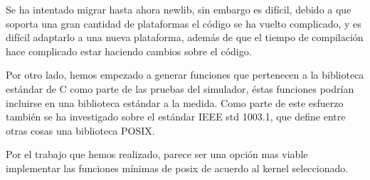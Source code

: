Se ha intentado migrar hasta ahora newlib, sin embargo es dif\'icil, debido a que soporta una gran cantidad de plataformas el c\'odigo se ha vuelto complicado, y es dif\'icil adaptarlo a una nueva plataforma, adem\'as de que el tiempo de compilaci\'on hace complicado estar haciendo cambios sobre el c\'odigo.

Por otro lado, hemos empezado a generar funciones que pertenecen a la biblioteca est\'andar de C como parte de las pruebas del simulador, \'estas funciones podr\'ian incluirse en una biblioteca est\'andar a la medida. Como parte de este esfuerzo tambi\'en se ha investigado sobre el est\'andar IEEE std 1003.1, que define entre otras cosas una biblioteca POSIX.

Por el trabajo que hemos realizado, parece ser una opci\'on mas viable implementar las funciones m\'inimas de posix de acuerdo al kernel seleccionado.

